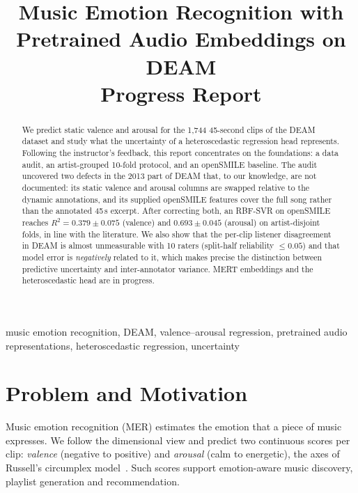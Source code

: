 \documentclass[conference]{IEEEtran}
\newcommand{\R}{R^2}
\begin{document}
\title{Music Emotion Recognition with Pretrained Audio Embeddings on DEAM\\[0.3em]
\large Progress Report}

\author{
}

\maketitle

\begin{abstract}
We predict static valence and arousal for the 1{,}744 45-second clips of the
DEAM dataset and study what the uncertainty of a heteroscedastic regression
head represents. Following the instructor's feedback, this report concentrates
on the foundations: a data audit, an artist-grouped 10-fold protocol, and an
openSMILE baseline. The audit uncovered two defects in the 2013 part of DEAM
that, to our knowledge, are not documented: its static valence and arousal
columns are swapped relative to the dynamic annotations, and its supplied
openSMILE features cover the full song rather than the annotated 45\,s excerpt.
After correcting both, an RBF-SVR on openSMILE reaches $\R=0.379\pm0.075$
(valence) and $0.693\pm0.045$ (arousal) on artist-disjoint folds, in line with
the literature. We also show that the per-clip listener disagreement in DEAM
is almost unmeasurable with 10 raters (split-half reliability $\le0.05$) and
that model error is \emph{negatively} related to it, which makes precise the
distinction between predictive uncertainty and inter-annotator variance. MERT
embeddings and the heteroscedastic head are in progress.
\end{abstract}

\begin{IEEEkeywords}
music emotion recognition, DEAM, valence--arousal regression, pretrained audio
representations, heteroscedastic regression, uncertainty
\end{IEEEkeywords}

\section{Problem and Motivation}
\label{sec:intro}
Music emotion recognition (MER) estimates the emotion that a piece of music
expresses. We follow the dimensional view and predict two continuous scores
per clip: \emph{valence} (negative to positive) and \emph{arousal} (calm to
energetic), the axes of Russell's circumplex model~\cite{russell1980}. Such
scores support emotion-aware music discovery, playlist generation and
recommendation.
\end{document}
